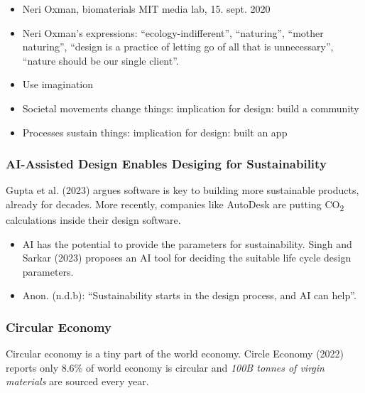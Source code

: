 \documentclass[
  letterpaper,
  DIV=11,
  numbers=noendperiod]{scrartcl}
\providecommand{\tightlist}{%
  \setlength{\itemsep}{0pt}\setlength{\parskip}{0pt}}\usepackage{longtable,booktabs,array}
\begin{document}
\begin{itemize}
\item
  Neri Oxman, biomaterials MIT media lab, 15. sept. 2020
\item
  Neri Oxman's expressions: ``ecology-indifferent'', ``naturing'',
  ``mother naturing'', ``design is a practice of letting go of all that
  is unnecessary'', ``nature should be our single client''.
\item
  Use imagination
\item
  Societal movements change things: implication for design: build a
  community
\item
  Processes sustain things: implication for design: built an app
\end{itemize}

\subsubsection{AI-Assisted Design Enables Desiging for
Sustainability}\label{ai-assisted-design-enables-desiging-for-sustainability}

Gupta et al. (2023) argues software is key to building more sustainable
products, already for decades. More recently, companies like AutoDesk
are putting CO\textsubscript{2} calculations inside their design
software.

\begin{itemize}
\tightlist
\item
  AI has the potential to provide the parameters for sustainability.
  Singh and Sarkar (2023) proposes an AI tool for deciding the suitable
  life cycle design parameters.
\item
  Anon. (n.d.b): ``Sustainability starts in the design process, and AI
  can help''.
\end{itemize}

\subsubsection{Circular Economy}\label{circular-economy}

Circular economy is a tiny part of the world economy. Circle Economy
(2022) reports only 8.6\% of world economy is circular and \emph{100B
tonnes of virgin materials} are sourced every year.
\end{document}
